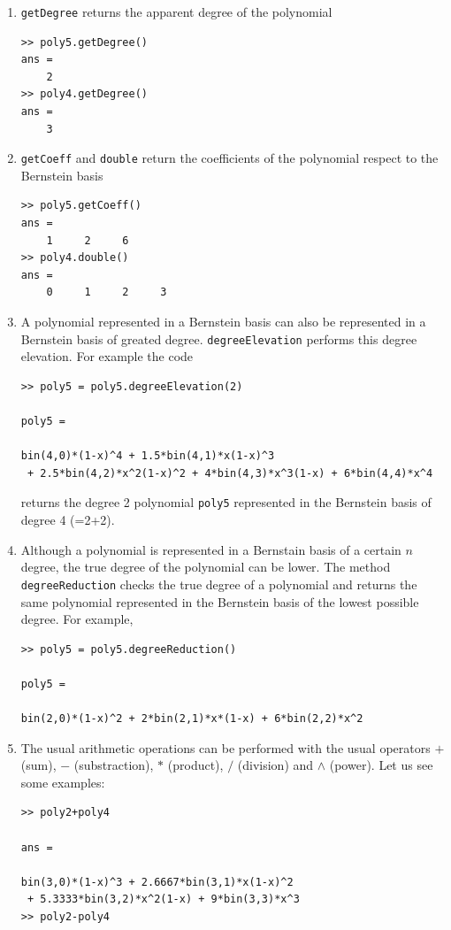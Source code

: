 \documentclass[a4paper,10pt]{report}
\begin{document}
\begin{enumerate}
 \item \verb"getDegree" returns the apparent degree of the polynomial
\begin{verbatim}
>> poly5.getDegree()
ans =
    2
>> poly4.getDegree()
ans =
    3
\end{verbatim}  
  \item \verb"getCoeff" and \verb"double" return the coefficients of the polynomial respect to the Bernstein basis
\begin{verbatim}
>> poly5.getCoeff()
ans =
    1     2     6
>> poly4.double()
ans =
    0     1     2     3
\end{verbatim}  
  \item A polynomial represented in a Bernstein basis can also be represented in a Bernstein basis of greated degree. 
    \verb"degreeElevation" performs this degree elevation. For example the code
\begin{verbatim}
>> poly5 = poly5.degreeElevation(2)

poly5 = 

bin(4,0)*(1-x)^4 + 1.5*bin(4,1)*x(1-x)^3 
 + 2.5*bin(4,2)*x^2(1-x)^2 + 4*bin(4,3)*x^3(1-x) + 6*bin(4,4)*x^4
\end{verbatim}   
  returns the degree 2 polynomial \verb"poly5" represented in the Bernstein basis of degree 4 (=2+2).
  \item Although a polynomial is represented in a Bernstain basis of a certain $n$ degree, the true degree of 
  the polynomial can be lower. The method \verb"degreeReduction" checks the true degree of a polynomial and returns
  the same polynomial represented in the Bernstein basis of the lowest possible degree. For example,
\begin{verbatim}
>> poly5 = poly5.degreeReduction()

poly5 = 

bin(2,0)*(1-x)^2 + 2*bin(2,1)*x*(1-x) + 6*bin(2,2)*x^2
\end{verbatim}  
  \item The usual arithmetic operations can be performed with the usual operators $+$ (sum), $-$ (substraction), $*$ (product),
    $/$ (division) and $\wedge$ (power). Let us see some examples:
\begin{verbatim}
>> poly2+poly4

ans = 

bin(3,0)*(1-x)^3 + 2.6667*bin(3,1)*x(1-x)^2 
 + 5.3333*bin(3,2)*x^2(1-x) + 9*bin(3,3)*x^3
>> poly2-poly4


\end{verbatim}
\end{enumerate}
\end{document}
